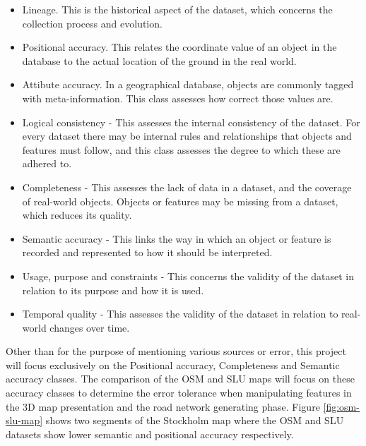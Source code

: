 \documentclass{kththesis}
\begin{document}
\begin{itemize}
  \item Lineage. This is the historical aspect of the dataset, which concerns the collection process and evolution.
  \item Positional accuracy. This relates the coordinate value of an object in the database to the actual location of the ground in the real world.
  \item Attibute accuracy. In a geographical database, objects are commonly tagged with meta-information. This class assesses how correct those values are.
  \item Logical consistency - This assesses the internal consistency of the dataset. For every dataset there may be internal rules and relationships that objects and features must follow, and this class assesses the degree to which these are adhered to.
  \item Completeness - This assesses the lack of data in a dataset, and the coverage of real-world objects. Objects or features may be missing from a dataset, which reduces its quality.
  \item Semantic accuracy - This links the way in which an object or feature is recorded and represented to how it should be interpreted.
  \item Usage, purpose and constraints - This concerns the validity of the dataset in relation to its purpose and how it is used.
  \item Temporal quality - This assesses the validity of the dataset in relation to real-world changes over time.
\end{itemize}

Other than for the purpose of mentioning various sources or error, this project will focus exclusively on the Positional accuracy, Completeness and Semantic accuracy classes.
The comparison of the OSM and SLU maps will focus on these accuracy classes to determine the error tolerance when manipulating features in the 3D map presentation and the road network generating phase.
Figure \ref{fig:osm-slu-map} shows two segments of the Stockholm map where the OSM and SLU datasets show lower semantic and positional accuracy respectively.
\end{document}
